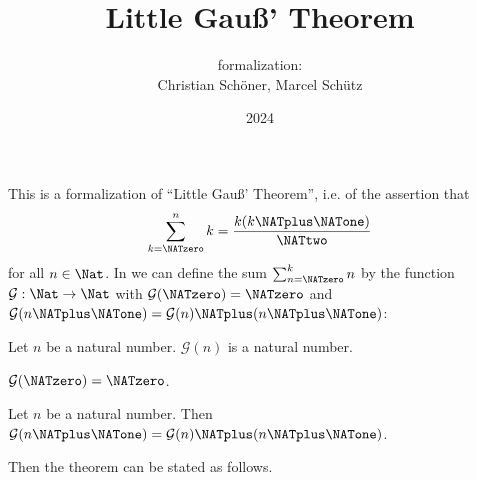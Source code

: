 \documentclass{article}
\title{Little Gauß' Theorem}
\author{\Naproche formalization:\\[0.5em]Christian Schöner, Marcel Schütz}
\date{2024}
\newcommand{\gauss}{\mathcal{G}}
\begin{document}
  \maketitle


  \noindent This is a formalization of ``Little Gauß' Theorem'', i.e. of
  the assertion that
  \[\sum_{k=\NATzero}^n k = \frac{k(k \NATplus \NATone)}\NATtwo\]
  for all $n \in \Nat$.
  In \Naproche we can define the sum $\sum_{n=\NATzero}^k n$ by the function
  $\gauss : \Nat \to \Nat$ with $\gauss(\NATzero) = \NATzero$ and
  $\gauss(n \NATplus \NATone) = \gauss(n) \NATplus (n \NATplus \NATone)$:

  \begin{forthel}
    \begin{signature*}
      Let $n$ be a natural number.
      $\gauss(n)$ is a natural number.
    \end{signature*}

    \begin{axiom*}
      $\gauss(\NATzero) = \NATzero$.
    \end{axiom*}

    \begin{axiom*}
      Let $n$ be a natural number.
      Then $\gauss(n \NATplus \NATone) = \gauss(n) \NATplus (n \NATplus \NATone)$.
    \end{axiom*}
  \end{forthel}

  \noindent Then the theorem can be stated as follows.
\end{document}
